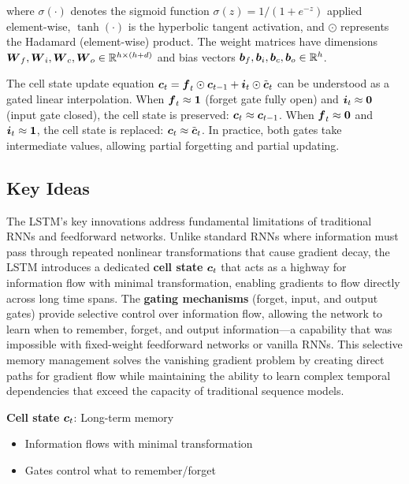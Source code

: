 where $\sigma(\cdot)$ denotes the sigmoid function $\sigma(z) = 1/(1+e^{-z})$ applied element-wise, $\tanh(\cdot)$ is the hyperbolic tangent activation, and $\odot$ represents the Hadamard (element-wise) product. The weight matrices have dimensions $\boldsymbol{W}_f, \boldsymbol{W}_i, \boldsymbol{W}_c, \boldsymbol{W}_o \in \mathbb{R}^{h \times (h+d)}$ and bias vectors $\boldsymbol{b}_f, \boldsymbol{b}_i, \boldsymbol{b}_c, \boldsymbol{b}_o \in \mathbb{R}^h$.

The cell state update equation $\boldsymbol{c}_t = \boldsymbol{f}_t \odot \boldsymbol{c}_{t-1} + \boldsymbol{i}_t \odot \tilde{\boldsymbol{c}}_t$ can be understood as a gated linear interpolation. When $\boldsymbol{f}_t \approx \boldsymbol{1}$ (forget gate fully open) and $\boldsymbol{i}_t \approx \boldsymbol{0}$ (input gate closed), the cell state is preserved: $\boldsymbol{c}_t \approx \boldsymbol{c}_{t-1}$. When $\boldsymbol{f}_t \approx \boldsymbol{0}$ and $\boldsymbol{i}_t \approx \boldsymbol{1}$, the cell state is replaced: $\boldsymbol{c}_t \approx \tilde{\boldsymbol{c}}_t$. In practice, both gates take intermediate values, allowing partial forgetting and partial updating.

\subsection{Key Ideas}

The LSTM's key innovations address fundamental limitations of traditional RNNs and feedforward networks. Unlike standard RNNs where information must pass through repeated nonlinear transformations that cause gradient decay, the LSTM introduces a dedicated \textbf{cell state} $\boldsymbol{c}_t$ that acts as a highway for information flow with minimal transformation, enabling gradients to flow directly across long time spans. The \textbf{gating mechanisms} (forget, input, and output gates) provide selective control over information flow, allowing the network to learn when to remember, forget, and output information—a capability that was impossible with fixed-weight feedforward networks or vanilla RNNs. This selective memory management solves the vanishing gradient problem by creating direct paths for gradient flow while maintaining the ability to learn complex temporal dependencies that exceed the capacity of traditional sequence models.

\textbf{Cell state} $\boldsymbol{c}_t$: Long-term memory
\begin{itemize}
    \item Information flows with minimal transformation
    \item Gates control what to remember/forget
\end{itemize}

